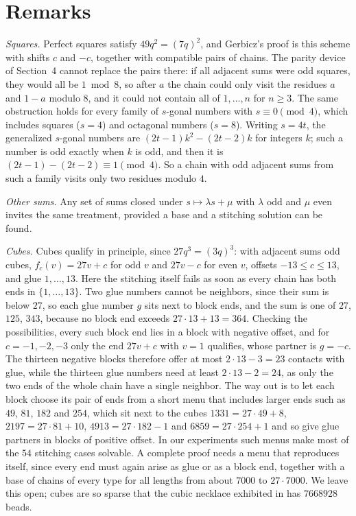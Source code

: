 \documentclass[11pt]{article}
\theoremstyle{definition}
\theoremstyle{remark}
\begin{document}
\section{Remarks}

\emph{Squares.} Perfect squares satisfy $49q^2=(7q)^2$, and Gerbicz's proof \cite{Gerbicz} is
this scheme with shifts $c$ and $-c$, together with compatible pairs of chains. The parity device of
Section~4 cannot replace the pairs there: if all adjacent sums were odd squares, they would all be
$1\bmod 8$, so after $a$ the chain could only visit the residues $a$ and $1-a$ modulo $8$, and it
could not contain all of $1,\dots,n$ for $n\ge3$.
The same obstruction holds for every family of $s$-gonal numbers with $s\equiv0\pmod 4$, which
includes squares ($s=4$) and octagonal numbers ($s=8$). Writing $s=4t$, the generalized $s$-gonal
numbers are $(2t-1)k^2-(2t-2)k$ for integers $k$; such a number is odd exactly when $k$ is odd, and then
it is $(2t-1)-(2t-2)\equiv1\pmod4$. So a chain with odd adjacent sums from such a family visits only
two residues modulo $4$.

\emph{Other sums.} Any set of sums closed under $s\mapsto \lambda s+\mu$ with $\lambda$ odd and $\mu$ even
invites the same treatment, provided a base and a stitching solution can be found.

\emph{Cubes.} Cubes qualify in principle, since $27q^3=(3q)^3$: with adjacent sums odd cubes,
$f_c(v)=27v+c$ for odd $v$ and $27v-c$ for even $v$, offsets $-13\le c\le 13$, and glue $1,\dots,13$.
Here the stitching itself fails as soon as every chain has both ends in $\{1,\dots,13\}$. Two glue
numbers cannot be neighbors, since their sum is below $27$, so each glue number $g$ sits next to block
ends, and the sum is one of $27$, $125$, $343$, because no block end exceeds $27\cdot13+13=364$.
Checking the possibilities, every such block end lies in a block with negative offset, and for
$c=-1,-2,-3$ only the end $27v+c$ with $v=1$ qualifies, whose partner is $g=-c$. The thirteen
negative blocks therefore offer at most $2\cdot13-3=23$ contacts with glue, while the thirteen glue
numbers need at least $2\cdot13-2=24$, as only the two ends of the whole chain have a single
neighbor. The way out is to let each block choose its pair of ends from a short menu that includes
larger ends such as $49$, $81$, $182$ and $254$, which sit next to the cubes
$1331=27\cdot49+8$, $2197=27\cdot81+10$, $4913=27\cdot182-1$ and $6859=27\cdot254+1$ and so give glue
partners in blocks of positive offset. In our experiments such menus make most of the $54$
stitching cases solvable. A complete proof needs a menu that reproduces itself, since every end
must again arise as glue or as a block end, together with a base of chains of every type for all
lengths from about $7000$ to $27\cdot7000$. We leave this open; cubes are so sparse that the cubic
necklace exhibited in \cite{BG} has $7668928$ beads.
\end{document}
